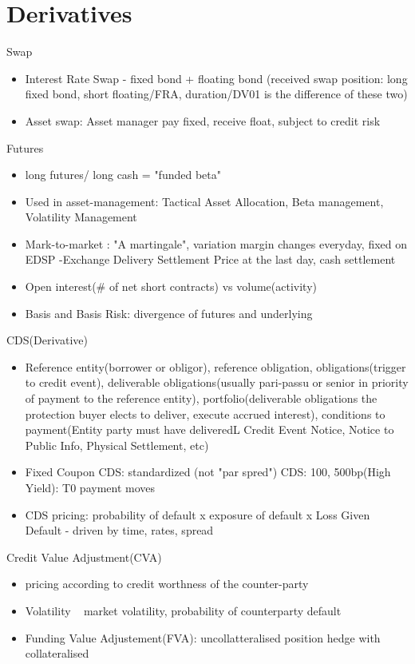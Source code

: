 \documentclass[11pt, openany]{book}              %
\begin{document}
\section{Derivatives}

Swap
\begin{itemize}
    \item Interest Rate Swap - fixed bond + floating bond (received swap position: long fixed bond, short floating/FRA, duration/DV01 is the difference of these two)
    \item Asset swap: Asset manager pay fixed, receive float, subject to credit risk
 \end{itemize}

Futures
\begin{itemize}
    \item long futures/ long cash = "funded beta"
     \item Used in asset-management: Tactical Asset Allocation, Beta management, Volatility Management
     \item Mark-to-market : "A martingale", variation margin changes everyday, fixed on EDSP -Exchange Delivery Settlement Price at the last day, cash settlement
     \item Open interest(\# of net short contracts) vs volume(activity)
     \item Basis and Basis Risk: divergence of futures and underlying
\end{itemize}

CDS(Derivative)
 \begin{itemize}
    \item Reference entity(borrower or obligor), reference obligation, obligations(trigger to credit event), deliverable obligations(usually pari-passu or senior in priority of payment to the reference entity), portfolio(deliverable obligations the protection buyer elects to deliver, execute accrued interest), conditions to payment(Entity party must have deliveredL Credit Event Notice, Notice to Public Info, Physical Settlement, etc)
    \item Fixed Coupon CDS: standardized (not "par spred") CDS: 100, 500bp(High Yield): T0 payment moves
    \item CDS pricing: probability of default x exposure of default x Loss Given Default  - driven by time, rates, spread
 \end{itemize}

Credit Value Adjustment(CVA)
 \begin{itemize}
    \item pricing according to credit worthness of the counter-party
    \item Volatility ~ market volatility, probability of counterparty default 
    \item Funding Value Adjustement(FVA): uncollatteralised position hedge with collateralised
    
\end{itemize}
\end{document}
